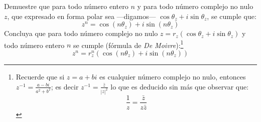 \begin{exercise}
  \label{ex:DeMoivre}
  Demuestre que para todo número entero $n$ y para todo número
  complejo no nulo $z$, que expresado en forma polar sea ---digamos---
  $\cos\theta_{z}+i\sin\theta_{z}$, se cumple que:
  \begin{equation}
    \label{eq:DeMoivre}
    z^{n}=\cos(n\theta_{z})+i\sin(n\theta_{z})
  \end{equation}
  Concluya que para todo número complejo no nulo
  $z=r_{z}(\cos\theta_{z}+i\sin\theta_{z})$ y todo número entero $n$
  se cumple (fórmula de \textit{De Moivre}):\footnote{Recuerde que si
    $z=a+bi$ es cualquier número complejo no nulo, entonces
    $z^{-1}=\frac{a-bi}{a^{2}+b^{2}}$; es decir
    $z^{-1}=\frac{\bar{z}}{|z|^{2}}$ lo que es deducido sin más que
    observar que:
    \begin{equation*}
      \frac{1}{z}=\frac{\bar{z}}{z\bar{z}}
    \end{equation*}
  }
  \begin{equation}
    \label{eq:DeMoivreGen}
    z^{n}=r_{z}^{n}(\cos(n\theta_{z})+i\sin(n\theta_{z}))
  \end{equation}  
\end{exercise}

